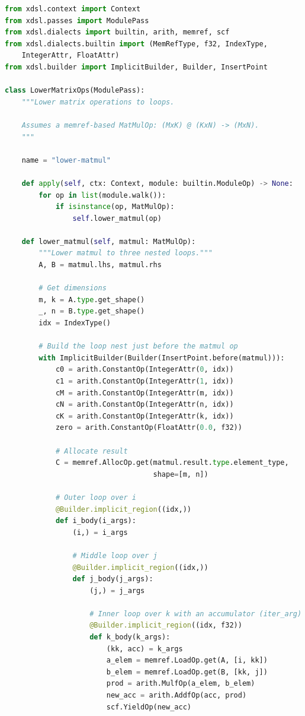 \documentclass[11pt,a4paper]{article}
\begin{document}
\begin{lstlisting}[language=Python, caption=Lowering High-Level Operations]
from xdsl.context import Context
from xdsl.passes import ModulePass
from xdsl.dialects import builtin, arith, memref, scf
from xdsl.dialects.builtin import (MemRefType, f32, IndexType,
    IntegerAttr, FloatAttr)
from xdsl.builder import ImplicitBuilder, Builder, InsertPoint

class LowerMatrixOps(ModulePass):
    """Lower matrix operations to loops.

    Assumes a memref-based MatMulOp: (MxK) @ (KxN) -> (MxN).
    """

    name = "lower-matmul"

    def apply(self, ctx: Context, module: builtin.ModuleOp) -> None:
        for op in list(module.walk()):
            if isinstance(op, MatMulOp):
                self.lower_matmul(op)
    
    def lower_matmul(self, matmul: MatMulOp):
        """Lower matmul to three nested loops."""
        A, B = matmul.lhs, matmul.rhs
 
        # Get dimensions
        m, k = A.type.get_shape()
        _, n = B.type.get_shape()
        idx = IndexType()

        # Build the loop nest just before the matmul op
        with ImplicitBuilder(Builder(InsertPoint.before(matmul))):
            c0 = arith.ConstantOp(IntegerAttr(0, idx))
            c1 = arith.ConstantOp(IntegerAttr(1, idx))
            cM = arith.ConstantOp(IntegerAttr(m, idx))
            cN = arith.ConstantOp(IntegerAttr(n, idx))
            cK = arith.ConstantOp(IntegerAttr(k, idx))
            zero = arith.ConstantOp(FloatAttr(0.0, f32))

            # Allocate result
            C = memref.AllocOp.get(matmul.result.type.element_type,
                                   shape=[m, n])
            
            # Outer loop over i
            @Builder.implicit_region((idx,))
            def i_body(i_args):
                (i,) = i_args

                # Middle loop over j
                @Builder.implicit_region((idx,))
                def j_body(j_args):
                    (j,) = j_args

                    # Inner loop over k with an accumulator (iter_arg)
                    @Builder.implicit_region((idx, f32))
                    def k_body(k_args):
                        (kk, acc) = k_args
                        a_elem = memref.LoadOp.get(A, [i, kk])
                        b_elem = memref.LoadOp.get(B, [kk, j])
                        prod = arith.MulfOp(a_elem, b_elem)
                        new_acc = arith.AddfOp(acc, prod)
                        scf.YieldOp(new_acc)
                    

\end{lstlisting}
\end{document}

